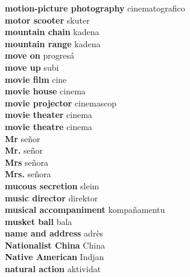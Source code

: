 \textbf{ motion-picture photography  } cinematografico \\
\textbf{ motor scooter  } skuter \\
\textbf{ mountain chain  } kadena \\
\textbf{ mountain range  } kadena \\
\textbf{ move on  } progresá \\
\textbf{ move up  } subi \\
\textbf{ movie film  } cine \\
\textbf{ movie house  } cinema \\
\textbf{ movie projector  } cinemascop \\
\textbf{ movie theater  } cinema \\
\textbf{ movie theatre  } cinema \\
\textbf{ Mr  } señor \\
\textbf{ Mr.  } señor \\
\textbf{ Mrs  } señora \\
\textbf{ Mrs.  } señora \\
\textbf{ mucous secretion  } sleim \\
\textbf{ music director  } direktor \\
\textbf{ musical accompaniment  } kompañamentu \\
\textbf{ musket ball  } bala \\
\textbf{ name and address  } adrès \\
\textbf{ Nationalist China  } China \\
\textbf{ Native American  } Indjan \\
\textbf{ natural action  } aktividat \\
